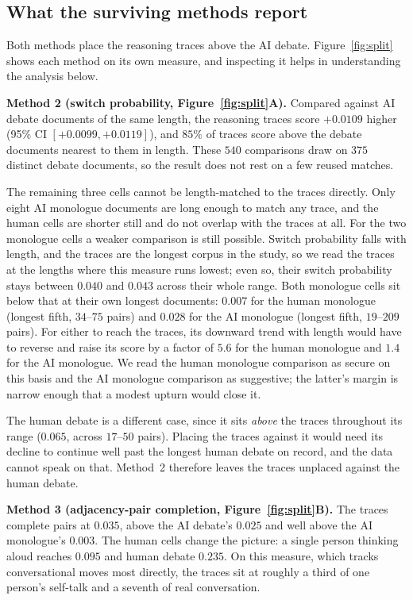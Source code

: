 \documentclass[10pt,twocolumn]{article}
\begin{document}
\subsection{What the surviving methods report}
Both methods place the reasoning traces above the AI debate. Figure~\ref{fig:split} shows each
method on its own measure, and inspecting it helps in understanding the analysis below.

\textbf{Method 2 (switch probability, Figure~\ref{fig:split}A).} Compared against AI debate documents
of the same length, the reasoning traces score $+0.0109$ higher (95\% CI $[+0.0099,+0.0119]$), and
$85\%$ of traces score above the debate documents nearest to them in length. These $540$ comparisons
draw on $375$ distinct debate documents, so the result does not rest on a few reused matches.

The remaining three cells cannot be length-matched to the traces directly. Only eight AI monologue
documents are long enough to match any trace, and the human cells are shorter still and do not
overlap with the traces at all. For the two monologue cells a weaker comparison is still possible.
Switch probability falls with length, and the traces are the longest corpus in the study, so we read
the traces at the lengths where this measure runs lowest; even so, their switch
probability stays between $0.040$ and $0.043$ across their whole range. Both monologue cells sit
below that at their own longest documents: $0.007$ for the human monologue (longest fifth, $34$--$75$
pairs) and $0.028$ for the AI monologue (longest fifth, $19$--$209$ pairs). For either to reach the
traces, its downward trend with length would have to reverse and raise its score by a factor of
$5.6$ for the human monologue and $1.4$ for the AI monologue. We read the human monologue comparison as
secure on this basis and the AI monologue comparison as suggestive; the latter's margin is narrow
enough that a modest upturn would close it.

The human debate is a different case, since it sits \emph{above} the traces throughout its range
($0.065$, across $17$--$50$ pairs). Placing the traces against it would need its decline to continue
well past the longest human debate on record, and the data cannot speak on that. Method~2
therefore leaves the traces unplaced against the human debate.

\textbf{Method 3 (adjacency-pair completion, Figure~\ref{fig:split}B).} The traces complete pairs at $0.035$, above the AI
debate's $0.025$ and well above the AI monologue's $0.003$. The human cells change the picture: a
single person thinking aloud reaches $0.095$ and human debate $0.235$. On this measure, which tracks
conversational moves most directly, the traces sit at roughly a third of one person's self-talk and a
seventh of real conversation.
\end{document}
